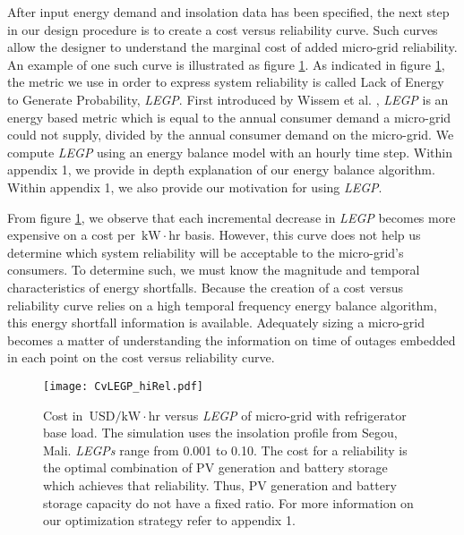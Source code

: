 \documentclass[11p]{article}
\newcommand{\unit}[1]{\ensuremath{\, \mathrm{#1}}}
\begin{document}
After input energy demand and insolation data has been specified, the next step in our design procedure is to create a cost versus reliability curve. 
Such curves allow the designer to understand the marginal cost of added micro-grid reliability.
An example of one such curve is illustrated as figure \ref{CVsLEGP}.
As indicated in figure \ref{CVsLEGP}, the metric we use in order to express system reliability is called Lack of Energy to Generate Probability, \emph{LEGP}. 
First introduced by Wissem et al. \cite{Wissem}, \emph{LEGP} is an energy based metric which is equal to the annual consumer demand a micro-grid could not supply, divided by the annual consumer demand on the micro-grid.
We compute \emph{LEGP} using an energy balance model with an hourly time step. 
Within appendix 1, we provide in depth explanation of our energy balance algorithm.
Within appendix 1, we also provide our motivation for using \emph{LEGP}.


From figure \ref{CVsLEGP}, we observe that each incremental decrease in \emph{LEGP} becomes more expensive on a cost per \unit{kW\! \cdot \! hr} basis.
However, this curve does not help us determine which system reliability will be acceptable to the micro-grid's consumers.
To determine such, we must know the magnitude and temporal characteristics of energy shortfalls. 
Because the creation of a cost versus reliability curve relies on a high temporal frequency energy balance algorithm, this energy shortfall information is available. 
Adequately sizing a micro-grid becomes a matter of understanding the information on time of outages embedded in each point on the cost versus reliability curve. 


\begin{figure}[ht] 
  \centering
    \texttt{[image: CvLEGP\_hiRel.pdf]}
  \caption{Cost in \unit{USD/kW\! \cdot \! hr} versus \emph{LEGP} of 
micro-grid with refrigerator base load.
The simulation uses the insolation profile from Segou, Mali.
\emph{LEGPs} range from 0.001 to 0.10.
The cost for a reliability is the optimal combination of PV generation and battery storage which achieves that reliability.
Thus, PV generation and battery storage capacity do not have a fixed ratio. 
For more information on our optimization strategy refer to appendix 1.}
\label{CVsLEGP}
\end{figure}

\end{document}
